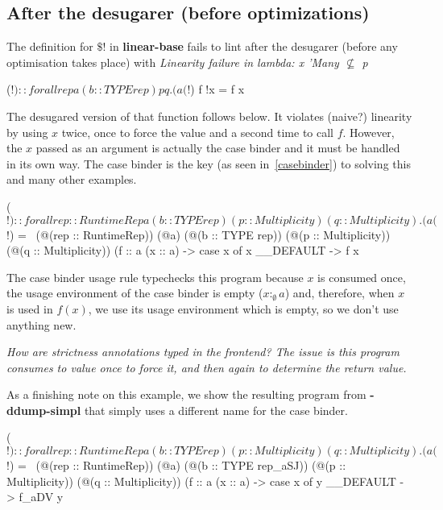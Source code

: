 \documentclass[]{lwnovathesis}
\begin{document}
\subsection{After the desugarer (before optimizations)}

The definition for $\$!$ in \textbf{linear-base}\cite{linearbase} fails to lint after the
desugarer (before any optimisation takes place) with \emph{Linearity failure in
lambda: x 'Many $\not\subseteq$ p}
\begin{code}
($!) :: forall {rep} a (b :: TYPE rep) p q. (a %
($!) f !x = f x
\end{code}

The desugared version of that function follows below. It violates (naive?)
linearity by using $x$ twice, once to force the value and a second time to call
$f$. However, the $x$ passed as an argument is actually the case binder and it
must be handled in its own way. The case binder is the key (as seen
in~\ref{casebinder}) to solving this
and many other examples.
\begin{code}
($!)
  :: forall {rep :: RuntimeRep} a (b :: TYPE rep) (p :: Multiplicity)
            (q :: Multiplicity).
     (a %
($!)
  = \ (@(rep :: RuntimeRep))
      (@a)
      (@(b :: TYPE rep))
      (@(p :: Multiplicity))
      (@(q :: Multiplicity))
      (f :: a %
      (x :: a) ->
      case x of x { __DEFAULT -> f x }
\end{code}

%
The case binder usage rule typechecks this program because $x$ is consumed once,
the usage environment of the case binder is empty ($x :_\emptyset a$) and,
therefore, when $x$ is used in $f(x)$, we use its usage environment which is
empty, so we don't use anything new.

\emph{How are strictness annotations typed in the frontend? The issue is this program
consumes to value once to force it, and then again to determine the return
value.}


As a finishing note on this example, we show the resulting program from
\textbf{-ddump-simpl} that simply uses a different name for the case binder.
\begin{code}
($!)
  :: forall {rep :: RuntimeRep} a (b :: TYPE rep)
            (p :: Multiplicity) (q :: Multiplicity).
     (a %
($!)
  = \ (@(rep :: RuntimeRep))
      (@a)
      (@(b :: TYPE rep_aSJ))
      (@(p :: Multiplicity))
      (@(q :: Multiplicity))
      (f :: a %
      (x :: a) ->
      case x of y { __DEFAULT -> f_aDV y }
\end{code}
\end{document}
